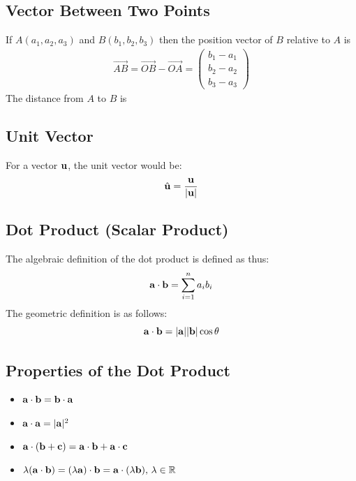 \documentclass[10pt, a4paper, titlepage]{article}
\begin{document}
\begin{multicols*}{3}
	\dotfill
	\subsection{Vector Between Two Points}
	If $A(a_1,a_2,a_3)$ and $B(b_1,b_2,b_3)$ then the position vector of $B$ relative to $A$ is 
	\begin{align}
		\overrightarrow{AB}=\overrightarrow{OB}-\overrightarrow{OA}=\begin{pmatrix}b_1-a_1\\ b_2-a_2 \\b_3-a_3\end{pmatrix}
	\end{align}
	The distance from $A$ to $B$ is
	\\
	
	\dotfill
	\subsection{Unit Vector}
	For a vector $\vb{u}$, the unit vector would be:
	\begin{equation}
		\hat{\vb{u}} = \frac{\vb{u}}{|\vb{u}|}
	\end{equation}

	\dotfill
	\subsection{Dot Product (Scalar Product)}
	The algebraic definition of the dot product is defined as thus:
	\begin{equation}
		\vb{a} \cdot \vb{b} = \sum_{i=1}^{n} a_i b_i
	\end{equation}
	The geometric definition is as follows:
	\begin{equation}
		\vb{a} \cdot \vb{b} = |\vb{a}||\vb{b}|\cos\theta
	\end{equation}

	\dotfill
	\subsection{Properties of the Dot Product}
	\begin{itemize}
		\item $\vb{a}\cdot\vb{b} = \vb{b}\cdot\vb{a}$
		\item $\vb{a}\cdot\vb{a} = |\vb{a}|^2$
		\item $\vb{a}\cdot(\vb{b}+\vb{c})=\vb{a}\cdot\vb{b}+\vb{a}\cdot\vb{c}$
		\item $\lambda(\vb{a}\cdot\vb{b})=(\lambda\vb{a})\cdot\vb{b}=\vb{a}\cdot(\lambda\vb{b}), \,\lambda\in\mathbb{R}$
	\end{itemize}


\end{multicols*}
\end{document}
